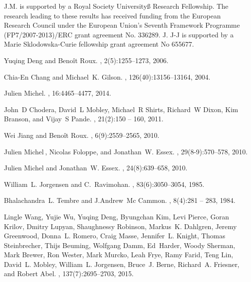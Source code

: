 \documentclass{svjour3}                     %
\begin{document}
\begin{acknowledgements}
J.M. is supported by a Royal Society Universityß Research Fellowship. The research leading to these results has received funding from the European Research Council under the European Union’s Seventh Framework Programme (FP7/2007-2013)/ERC grant agreement No. 336289. J. J-J is supported by a Marie Sklodowska-Curie fellowship grant agreement No 655677.
\end{acknowledgements}
\begin{thebibliography}{10}

Yuqing Deng and Benoît Roux.
, 2(5):1255--1273, 2006.

Chia-En Chang and Michael~K. Gilson.
, 126(40):13156--13164, 2004.

Julien Michel.
, 16:4465--4477, 2014.

John~D Chodera, David~L Mobley, Michael~R Shirts, Richard~W Dixon, Kim Branson,
  and Vijay~S Pande.
, 21(2):150 -- 160, 2011.

Wei Jiang and Benoît Roux.
, 6(9):2559--2565, 2010.

Julien Michel , Nicolas Foloppe, and Jonathan~W. Essex.
, 29(8-9):570--578, 2010.

Julien Michel and Jonathan~W. Essex.
, 24(8):639--658, 2010.

William~L. Jorgensen and C.~Ravimohan.
, 83(6):3050--3054, 1985.

Bhalachandra~L. Tembre and J.Andrew~Mc Cammon.
, 8(4):281 -- 283, 1984.

Lingle Wang, Yujie Wu, Yuqing Deng, Byungchan Kim, Levi Pierce, Goran Krilov,
  Dmitry Lupyan, Shaughnessy Robinson, Markus~K. Dahlgren, Jeremy Greenwood,
  Donna~L. Romero, Craig Masse, Jennifer~L. Knight, Thomas Steinbrecher, Thijs
  Beuming, Wolfgang Damm, Ed~Harder, Woody Sherman, Mark Brewer, Ron Wester,
  Mark Murcko, Leah Frye, Ramy Farid, Teng Lin, David~L. Mobley, William~L.
  Jorgensen, Bruce~J. Berne, Richard~A. Friesner, and Robert Abel.
, 137(7):2695--2703, 2015.


\end{thebibliography}
\end{document}
